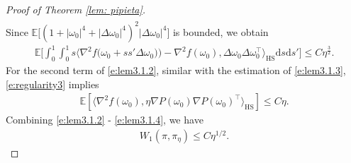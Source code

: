 \documentclass[12pt]{amsart}
\theoremstyle{definition}
\theoremstyle{remark}
\numberwithin{equation}{section}
\newcommand{\dif}{\mathrm{d}}
\newcommand{\E}{\mathbb{E}}            %
\newcommand{\Ll}{\langle}
\newcommand{\Rr}{\rangle}
\begin{document}
\begin{proof}[Proof of Theorem \ref{lem: pipieta}]
\begin{eqnarray*}
\end{eqnarray*}
Since $\E\big[(1+|\omega_0|^4+|\Delta\omega_0|^4)^2|\Delta\omega_0|^4\big]$ is bounded, we obtain
\begin{eqnarray}\label{e:lem3.1.3}
	\E\big[\int_0^1\int_0^1 s\Ll \nabla^2f\big(\omega_0+ss'\Delta\omega_0)\big)-\nabla^2f(\omega_0),\Delta\omega_0\Delta\omega_0^\top    \Rr_{\text {HS}}\dif s\dif s'\big]
	\le C\eta^{\frac32}.
\end{eqnarray}
For the second term of \eqref{e:lem3.1.2}, similar with the estimation of \eqref{e:lem3.1.3}, \eqref{e:regularity3} implies
\begin{eqnarray}\label{e:lem3.1.4}
\E[\Ll  \nabla^2f(\omega_0),\eta\nabla P(\omega_0)\nabla P(\omega_0)^\top
\Rr_{\text{HS}}]\le C\eta.
\end{eqnarray}
Combining \eqref{e:lem3.1.2} - \eqref{e:lem3.1.4}, we have
\begin{eqnarray*}
W_1(\pi,\pi_\eta)\le C\eta^{1/2}.
\end{eqnarray*}
\end{proof}
\end{document}
